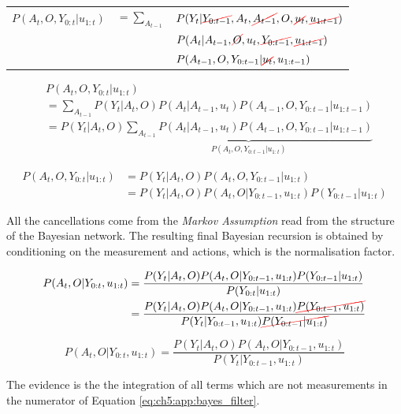 \begin{appendices}
\begin{tabular}{lll}
   $P(A_t,O,Y_{0:t}|u_{1:t})$ & $=\sum_{A_{t-1}}$ &  $P(Y_t|\Ccancel[red]{Y_{0:t-1}},A_t,\cancel{A_{t-1}},O,\cancel{u_{t}},\cancel{u_{1:t-1}}) $ \\
			      &  & $P(A_t|A_{t-1},\Ccancel[red]{O},u_{t},\Ccancel[red]{Y_{0:t-1}},\Ccancel[red]{u_{1:t-1}}) $ \\
			      &  & $P( A_{t-1},O,Y_{0:t-1}|\Ccancel[red]{u_t},u_{1:t-1})$
\end{tabular}

\begin{align}
  &P(A_t,O,Y_{0:t}|u_{1:t}) \\
  &= \sum_{A_{t-1}} P(Y_t|A_{t},O)  P(A_t|A_{t-1},u_{t})  P(A_{t-1},O,Y_{0:t-1}|u_{1:t-1}) \nonumber \\
  &= P(Y_t|A_{t},O)  \underbrace{\sum_{A_{t-1}} P(A_t|A_{t-1},u_t)  P(A_{t-1},O,Y_{0:t-1}|u_{1:t-1})}_{P(A_t,O,Y_{0:t-1}|u_{1:t})} 
\end{align}

\begin{align}
   P(A_t,O,Y_{0:t}|u_{1:t}) &= P(Y_t|A_{t},O)  P(A_t,O,Y_{0:t-1}|u_{1:t}) \nonumber \\
			    &= P(Y_t|A_{t},O)  P(A_t,O|Y_{0:t-1},u_{1:t})  P(Y_{0:t-1}|u_{1:t})
\end{align}

All the cancellations come from the \textit{Markov Assumption} read from the structure of the Bayesian network.
The resulting final Bayesian recursion is obtained by conditioning on the measurement and actions, which is the normalisation factor.

\begin{align}\label{eq:ch5_measurement_update}
 P(A_t,O|Y_{0:t},u_{1:t}) &= \frac{P(Y_t|A_{t},O)  P(A_t,O|Y_{0:t-1},u_{1:t})  P(Y_{0:t-1}|u_{1:t})}{P(Y_{0:t}|u_{1:t})} \nonumber \\
			  &= \frac{P(Y_t|A_{t},O)  P(A_t,O|Y_{0:t-1},u_{1:t})  \Ccancel[red]{P(Y_{0:t-1},u_{1:t})}}{P(Y_t|Y_{0:t-1},u_{1:t}) \Ccancel[red]{P(Y_{0:t-1}|u_{1:t})}}   
\end{align}
 
\begin{equation}
   P(A_t,O|Y_{0:t},u_{1:t}) = \frac{P(Y_t|A_{t},O) P(A_{t},O|Y_{0:t-1},u_{1:t})}{P(Y_t|Y_{0:t-1},u_{1:t})} \label{eq:ch5:app:bayes_filter}
\end{equation}

The evidence is the the integration of all terms which are not measurements in the numerator of Equation \ref{eq:ch5:app:bayes_filter}.


\end{appendices}
